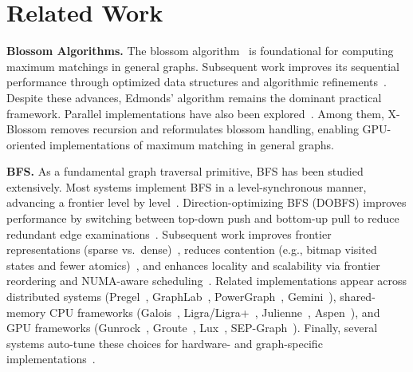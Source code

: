 \section{Related Work}
\textbf{Blossom Algorithms.}
The blossom algorithm~\cite{edmonds1965paths} is foundational for computing maximum matchings in general graphs. Subsequent work improves its sequential performance through optimized data structures and algorithmic refinements~\cite{gabow1976efficient, gabow1984efficient, gabow1990data, gabow1991faster, blum2015maximum}. Despite these advances, Edmonds’ algorithm remains the dominant practical framework.
Parallel implementations have also been explored~\cite{Stanford_2016, Wayne_2024, fan2025x}. Among them, X-Blossom removes recursion and reformulates blossom handling, enabling GPU-oriented implementations of maximum matching in general graphs.

\noindent
\textbf{BFS.}
As a fundamental graph traversal primitive, BFS has been studied extensively.
Most systems implement BFS in a level-synchronous manner, advancing a frontier level by level~\cite{bfs_levelsync}.
Direction-optimizing BFS (DOBFS) improves performance by switching between top-down push and bottom-up pull to reduce redundant edge examinations~\cite{beamer2011searching,beamer2013direction}. Subsequent work improves frontier representations (sparse vs.\ dense)~\cite{bfs_standford,shun2013ligra,shun2015ligraplus}, reduces contention (e.g., bitmap visited states and fewer atomics)~\cite{bfs_agarwal}, and enhances locality and scalability via frontier reordering and NUMA-aware scheduling~\cite{bfs_locality,bfs_numa,zhang2015numa,arai2016rabbit}. Related implementations appear across distributed systems (Pregel~\cite{malewicz2010pregel}, GraphLab~\cite{low2012graphlab}, PowerGraph~\cite{gonzalez2012powergraph}, Gemini~\cite{zhu2016gemini}), shared-memory CPU frameworks (Galois~\cite{nguyen2013galois}, Ligra/Ligra+~\cite{shun2013ligra,shun2015ligraplus}, Julienne~\cite{ligra_julienne}, Aspen~\cite{ligra_aspen}), and GPU frameworks (Gunrock~\cite{wang2016gunrock}, Groute~\cite{ben2017groute}, Lux~\cite{jia2017lux}, SEP-Graph~\cite{wang2019sep}). Finally, several systems auto-tune these choices for hardware- and graph-specific implementations~\cite{zhang2018graphit,graphit_ordered2020,graphit_gpu,graphit_novelarch}.


